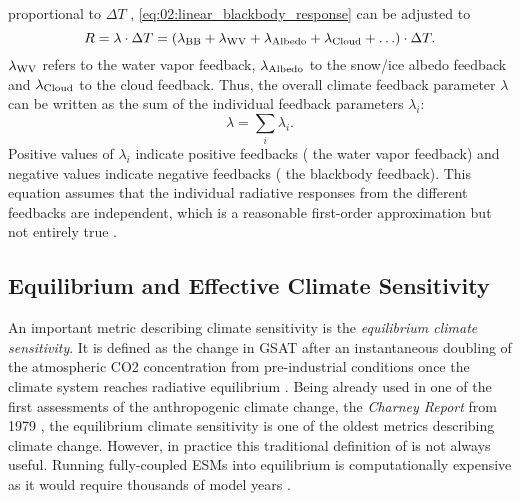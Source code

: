 proportional to $\Delta T$ \autocite{Gregory2008a},
\cref{eq:02:linear_blackbody_response} can be adjusted to
\begin{equation}
  R = \lambda \cdot \Delta T = \left( \lambda_{\textnormal{BB}} +
  \lambda_{\textnormal{WV}} + \lambda_{\textnormal{Albedo}} + \lambda_{\textnormal{Cloud}} +
  \ldots \right) \cdot \Delta T.
  \label{eq:02:linear_response}
\end{equation}
$\lambda_{\textnormal{WV}}$ refers to the water vapor feedback,
$\lambda_{\textnormal{Albedo}}$ to the snow/ice albedo feedback and
$\lambda_{\textnormal{Cloud}}$ to the cloud feedback. Thus, the overall climate
feedback parameter $\lambda$ can be written as the sum of the individual
feedback parameters $\lambda_i$:
\begin{equation}
  \lambda = \sum_i \lambda_i.
  \label{eq:02:lambda_as_sum_of_lambdas}
\end{equation}
Positive values of $\lambda_i$ indicate positive feedbacks (\eg{} the water
vapor feedback) and negative values indicate negative feedbacks (\eg{} the
blackbody feedback). This equation assumes that the individual radiative
responses from the different feedbacks are independent, which is a reasonable
first-order approximation but not entirely true \autocite{Soden2008}.

\subsection{Equilibrium and Effective Climate Sensitivity}
\label{subsec:02:ecs}

An important metric describing climate sensitivity is the \emph{equilibrium
  climate sensitivity}. It is defined as the change in \ac{GSAT} after an
instantaneous doubling of the atmospheric \ac{CO2} concentration from
pre-industrial conditions once the climate system reaches radiative equilibrium
\autocite{Bindoff2013}. Being already used in one of the first assessments of
the anthropogenic climate change, the \emph{Charney Report} from 1979
\autocite{Charney1979}, the equilibrium climate sensitivity is one of the
oldest metrics describing climate change. However, in practice this traditional
definition of is not always useful. Running fully-coupled \acp{ESM} into
equilibrium is computationally expensive as it would require thousands of model
years \autocite{Rugenstein2020}.

